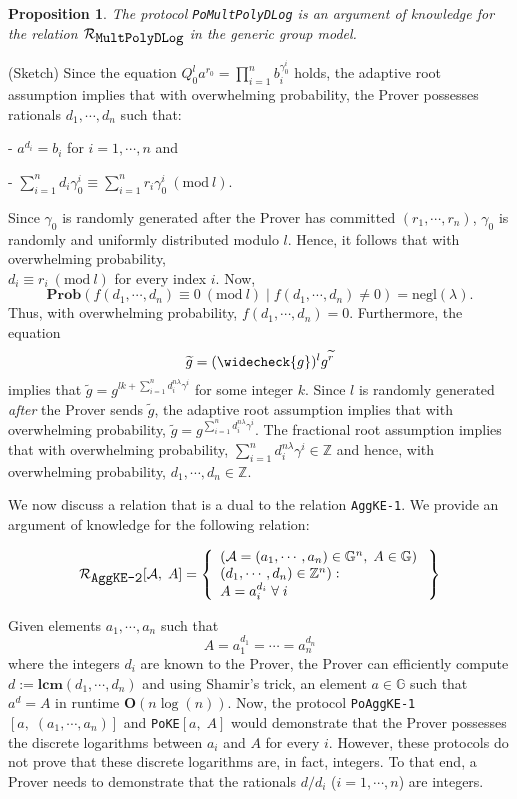 \documentclass[11pt, lettersize, notitlepage, leqno, footskip=0.6cm]{article}
\newcommand{\bz}{\mathbb Z}
\newcommand{\pl}{\prod\limits}
\newcommand{\slim}{\sum\limits}
\newcommand{\negl}{\mr{negl}}
\newcommand{\wti}{\widetilde}
\newcommand{\mc}{\mathcal}
\newcommand{\mb}{\mathbb}
\newcommand{\mbf}{\mathbf}
\newcommand{\mr}{\mathrm}
\newcommand{\lam}{\lambda}
\newcommand{\weck}{\widecheck}
\newcommand{\Prob}{\mbf{Prob}}
\newcommand{\vs}{\vspace{-0.15cm}}
\newcommand{\noin}{\noindent}
\newcommand{\op}{overwhelming probability}
\newcommand{\Mod}[1]{\ (\mathrm{mod}\ #1)}
\newcommand{\LCM}{\mbf{lcm}}
\newtheorem{Prop}[Thm]{Proposition}
\numberwithin{equation}{section}
\begin{document}
\begin{Prop} The protocol \verb|PoMultPolyDLog| is an argument of knowledge for the relation $\mc{R}_{{\protect\verb|MultPolyDLog|}}$ in the generic group model.\end{Prop}

\begin{prf} (Sketch) Since the equation $Q_0^l a^{r_0} = \pl_{i=1}^n b_i^{\gamma_0^i}$ holds, the adaptive root assumption implies that with \op, the Prover possesses rationals $d_1,\cdots,d_n$ such that: 

\noin - $a^{d_i} = b_i$ for $i=1,\cdots,n$ and 

\noin - $\sum\limits_{i=1}^n d_i\gamma_0^i\equiv \sum\limits_{i=1}^n r_i\gamma_0^i\Mod{l}.$ 

Since $\gamma_0$ is randomly generated after the Prover has committed $(r_1,\cdots,r_n)$, $\gamma_0$ is randomly and uniformly distributed modulo $l$. Hence, it follows that with \op,\\ $d_i\equiv r_i\Mod{l}$ for every index $i$. Now, \vs $$\Prob\left(f(d_1,\cdots,d_n)\equiv 0\Mod{l} \;\Big|\; f(d_1,\cdots,d_n)\neq 0 \right) = \negl(\lam) .$$ Thus, with \op, $f(d_1,\cdots,d_n) = 0$. Furthermore, the equation \vs $$\wti{g} = (\weck{g})^lg^{\wti{r}} $$ implies that $\wti{g} = g^{lk+\sum\limits_{i=1}^n d_i^{n\lam}\gamma^i}$ for some integer $k$. Since $l$ is randomly generated \textit{after} the Prover sends $\wti{g}$, the adaptive root assumption implies that with \op, $\wti{g} = g^{\slim_{i=1}^n d_i^{n\lam}\gamma^i}$. The fractional root assumption implies that with \op, $\slim_{i=1}^n d_i^{n\lam}\gamma^i\in \bz$ and hence, with \op, $d_1,\cdots,d_n\in\bz$.\end{prf} 


\noindent We now discuss a relation that is a dual to the relation \verb|AggKE-1|. We provide an argument of knowledge for the following relation: 

\[
  \mc{R}_{{\protect\verb|AggKE-2|}}[\mc{A},\;A] = \left\{\begin{array}{l}
    (\mc{A} = (a_1,\cdots, a_n)\in \mb{G}^n,\; A\in\mb{G})\;\\ 
    (d_1,\cdots,d_n)\in\bz^n) :  \\
     A = a_i^{d_i}\;\forall\; i
  \end{array}\right\}
\]
\vspace{0.1cm}

\noin Given elements $a_1,\cdots,a_n$ such that \vs $$A = a_1^{d_1} =\cdots = a_n^{d_n} $$ where the integers $d_i$ are known to the Prover, the Prover can efficiently compute $d:= \LCM(d_1,\cdots,d_n)$ and  using Shamir's trick, an element $a\in\mb{G}$ such that $a^d = A$ in runtime $\mbf{O}(n\log(n))$. Now, the protocol \verb|PoAggKE-1|$[a,\;(a_1,\cdots,a_n)]$ and \verb|PoKE|$[a,\;A]$ would demonstrate that the Prover possesses the discrete logarithms between $a_i$ and $A$ for every $i$. However, these protocols do not prove that these discrete logarithms are, in fact, integers. To that end, a Prover needs to demonstrate that the rationals $d/d_i$ ($i=1,\cdots, n$) are integers. 
\end{document}
